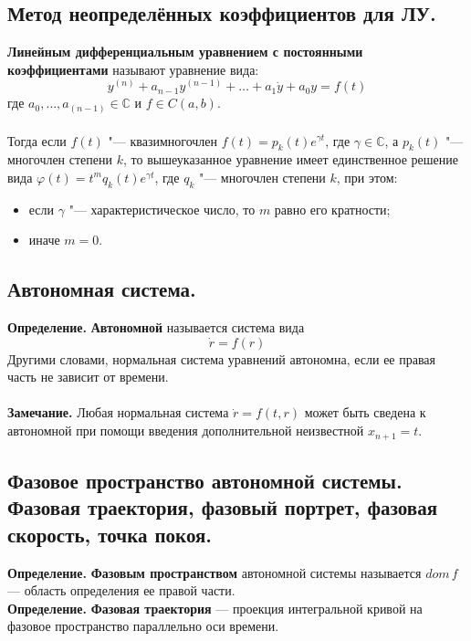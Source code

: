 \documentclass{article}
\begin{document}
\subsection{Метод неопределённых коэффициентов для ЛУ.}
\textbf{Линейным дифференциальным уравнением с постоянными коэффициентами} называют уравнение вида:
\begin{equation*}
    y^{(n)} + a_{n-1}y^{(n-1)} + \ldots + a_1\dot{y} + a_0y=f(t)
\end{equation*}
где $a_0, \ldots, a_{(n-1)} \in \mathbb{C}$ и $f \in C(a, b)$.\\\\
Тогда если $f(t)$ "--- квазимногочлен $f(t) = p_k(t)e^{\gamma t}$, где $\gamma \in \mathbb{C}$, а $p_k(t)$ "--- многочлен степени $k$, то вышеуказанное уравнение имеет единственное решение вида $\varphi(t) = t^mq_k(t)e^{\gamma t}$, где $q_k$ "--- многочлен степени $k$, при этом:
\begin{itemize}
    \item если $\gamma$ "--- характеристическое число, то $m$ равно его кратности;
    \item иначе $m=0$.
\end{itemize}

\subsection{Автономная система.}
\textbf{Определение.} \textbf{Автономной} называется система вида
\begin{equation*}
    \dot{r} = f(r)
\end{equation*}
Другими словами, нормальная система уравнений автономна, если ее правая часть не зависит от времени.\\\\
\textbf{Замечание.} Любая нормальная система $\dot{r} = f(t,r)$ может быть сведена к автономной при помощи введения дополнительной неизвестной $x_{n+1} = t$.

\subsection{Фазовое пространство автономной системы. Фазовая траектория, фазовый
портрет, фазовая скорость, точка покоя.}
\textbf{Определение.} \textbf{Фазовым пространством} автономной системы называется $dom\,f$ --- область определения ее правой части.\\

\noindent \textbf{Определение.} \textbf{Фазовая траектория} --- проекция интегральной кривой на фазовое пространство параллельно оси времени.\\
\end{document}
